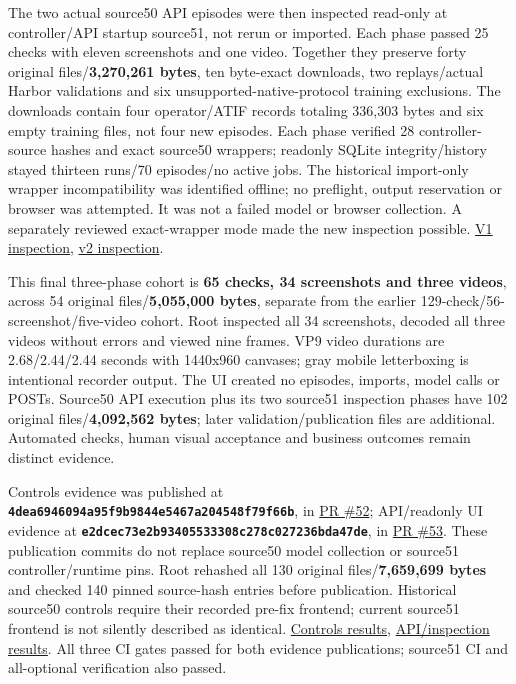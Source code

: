 \documentclass[
  11pt,
  letterpaper,
]{article}
\begin{document}
The two actual source50 API episodes were then inspected read-only at
controller/API startup source51, not rerun or imported. Each phase
passed 25 checks with eleven screenshots and one video. Together they
preserve forty original files/\textbf{3,270,261 bytes}, ten byte-exact
downloads, two replays/actual Harbor validations and six
unsupported-native-protocol training exclusions. The downloads contain
four operator/ATIF records totaling 336,303 bytes and six empty training
files, not four new episodes. Each phase verified 28 controller-source
hashes and exact source50 wrappers; readonly SQLite integrity/history
stayed thirteen runs/70 episodes/no active jobs. The historical
import-only wrapper incompatibility was identified offline; no
preflight, output reservation or browser was attempted. It was not a
failed model or browser collection. A separately reviewed exact-wrapper
mode made the new inspection possible.
\href{../../artifacts/native-api-smoke/qa/20261010-v1/ui-report.json}{V1
inspection},
\href{../../artifacts/native-api-smoke/qa/20261010-v2/ui-report.json}{v2
inspection}.

This final three-phase cohort is \textbf{65 checks, 34 screenshots and
three videos}, across 54 original files/\textbf{5,055,000 bytes},
separate from the earlier 129-check/56-screenshot/five-video cohort.
Root inspected all 34 screenshots, decoded all three videos without
errors and viewed nine frames. VP9 video durations are 2.68/2.44/2.44
seconds with 1440x960 canvases; gray mobile letterboxing is intentional
recorder output. The UI created no episodes, imports, model calls or
POSTs. Source50 API execution plus its two source51 inspection phases
have 102 original files/\textbf{4,092,562 bytes}; later
validation/publication files are additional. Automated checks, human
visual acceptance and business outcomes remain distinct evidence.

Controls evidence was published at
\textbf{\texttt{4dea6946094a95f9b9844e5467a204548f79f66b}}, in
\href{https://github.com/nthpaul/world-engine/pull/52}{PR \#52};
API/readonly UI evidence at
\textbf{\texttt{e2dcec73e2b93405533308c278c027236bda47de}}, in
\href{https://github.com/nthpaul/world-engine/pull/53}{PR \#53}. These
publication commits do not replace source50 model collection or source51
controller/runtime pins. Root rehashed all 130 original
files/\textbf{7,659,699 bytes} and checked 140 pinned source-hash
entries before publication. Historical source50 controls require their
recorded pre-fix frontend; current source51 frontend is not silently
described as identical. \href{../native-controls-qa-results.md}{Controls
results}, \href{../native-api-smoke-results.md}{API/inspection results}.
All three CI gates passed for both evidence publications; source51 CI
and all-optional verification also passed.
\end{document}
